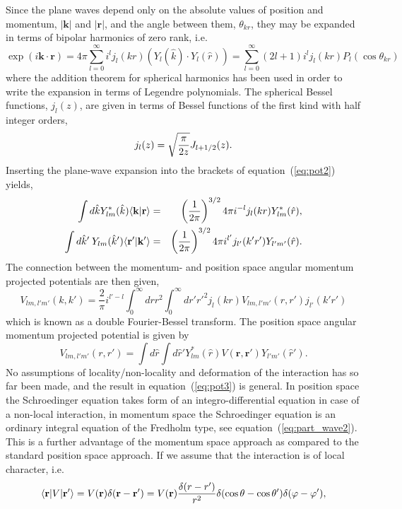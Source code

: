 \documentclass[graybox,sectrefs,envcountresetchap,open=right]{svmonodo}
\begin{document}
Since the plane waves depend only on the absolute values of position and momentum, $\vert\mathbf{k}\vert$ and 
$\vert\mathbf{r}\vert$,
and the angle between them, $\theta_{kr}$, they may be expanded in terms of bipolar harmonics of 
zero rank, i.e.  
\[ 
  \exp{(i \mathbf{k}\cdot \mathbf{r})} = 4\pi\sum_{l=0}^{\infty} i^l j_l(kr)\left( Y_l(\hat{k}) \cdot Y_l(\hat{r}) \right)= \sum_{l=0}^{\infty} (2l+1)i^l j_l(kr) P_l(\cos \theta_{kr}) 
\]
where the addition theorem for spherical harmonics has been used in order to write
the expansion in terms of Legendre polynomials. The spherical Bessel functions, $j_l(z)$,  
are given in terms of Bessel functions of the first kind with half integer orders,  
\[
j_l(z) = \sqrt{\pi \over 2 z} J_{l+1/2}(z).  
\]
Inserting the plane-wave expansion
into the brackets of equation~(\ref{eq:pot2}) yields, 
\begin{eqnarray*}
  \nonumber
  \int d{\hat{k}}  Y_{lm}^*(\hat{k})\langle \mathbf{k}\vert \mathbf{r} \rangle & = &  
  \left( {1\over 2\pi} \right) ^{3/2}4\pi i^{-l} j_l(kr) Y_{lm}^*(\hat{r}), \\  
  \nonumber
  \int d{\hat{k}'}\:   Y_{lm}(\hat{k}') \langle \mathbf{r'}\vert \mathbf{k}' \rangle & = &  
  \left( {1\over 2\pi} \right) ^{3/2}4\pi i^{l'} j_{l'}(k'r') Y_{l'm'}(\hat{r}). 
\end{eqnarray*}
The connection between the momentum- and position space angular momentum 
projected potentials are then given, 
\[
  V_{lm, l'm'}(k,k')=\frac{2}{\pi}i^{l'-l}\int_0^\infty drr^2 \int_0^\infty dr'{r'}^2j_l(kr) V_{lm,l'm'}(r,r') j_{l'}(k'r')
  \label{eq:pot3}
\]
which is known as a double Fourier-Bessel transform. The position space angular 
momentum projected potential is given by
\[
  V_{lm, l'm'}(r,r') = \int d{\hat{r}} \int d{\hat{r}'}Y_{lm}^*(\hat{r})V(\mathbf{r}, \mathbf{r'})Y_{l'm'}(\hat{r}').
  \label{eq:pot4}
\]
No assumptions of locality/non-locality and deformation of the interaction has so far been made, 
and the result in equation~(\ref{eq:pot3}) is general. In position space the Schroedinger equation 
takes form of an integro-differential equation in case of a non-local interaction, 
in momentum space the Schroedinger equation is an ordinary integral equation of the Fredholm type, 
see equation~(\ref{eq:part_wave2}). This is a further advantage of the momentum space approach as compared to 
the standard position space approach.  
If we assume that the 
interaction is of local character, i.e. 
\[
  \langle \mathbf{r}\vert V \vert \mathbf{r'}\rangle = V(\mathbf{r}) \delta( \mathbf{r}-\mathbf{r}' ) = 
  V(\mathbf{r}) {\delta( { r}-{r}' ) \over r^2} \delta ( \cos \theta - \cos \theta' ) \delta (\varphi-\varphi'), 
\]
\end{document}
